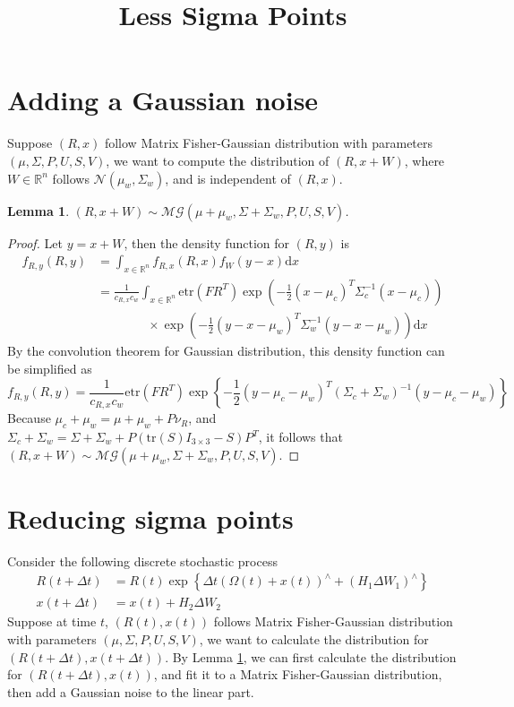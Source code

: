 \documentclass[10pt]{article}
\title{\vspace{-4ex}\textbf{Less Sigma Points\vspace{-4ex}}}
\date{}
\newtheorem{lemma}{Lemma}
\newcommand{\tr}[1]{\ensuremath{\mathrm{tr}\left( #1 \right)}}
\newcommand{\etr}[1]{\ensuremath{\mathrm{etr}\left( #1 \right)}}
\newcommand{\real}[1]{\ensuremath{\mathbb{R}^{ #1 }}}
\newcommand{\diff}[1]{\ensuremath{\mathrm{d} #1}}
\begin{document}
\maketitle

\section{Adding a Gaussian noise}
Suppose $(R,x)$ follow Matrix Fisher-Gaussian distribution with parameters $(\mu,\Sigma,P,U,S,V)$, we want to compute the distribution of $(R,x+W)$, where $W\in\real{n}$ follows $\mathcal{N}(\mu_w,\Sigma_w)$, and is independent of $(R,x)$.
\begin{lemma} \label{lamma:AddGaussianNoise}
	$(R,x+W)\sim\mathcal{MG}(\mu+\mu_w,\Sigma+\Sigma_w,P,U,S,V)$.
\end{lemma}
\begin{proof}
	Let $y=x+W$, then the density function for $(R,y)$ is
	\begin{align} \label{eqn:fRy}
		f_{R,y}(R,y) &= \int_{x\in\real{n}}f_{R,x}(R,x)f_W(y-x)\diff{x} \nonumber \\
		&= \frac{1}{c_{R,x}c_w}\int_{x\in\real{n}} \etr{FR^T} \exp\left(-\frac{1}{2}(x-\mu_c)^T\Sigma_c^{-1}(x-\mu_c)\right) \nonumber \\ 
		&\qquad\qquad\times \exp\left(-\frac{1}{2}(y-x-\mu_w)^T\Sigma_w^{-1}(y-x-\mu_w)\right) \diff{x}
	\end{align}
	By the convolution theorem for Gaussian distribution, this density function can be simplified as
	\begin{equation*}
		f_{R,y}(R,y) = \frac{1}{c_{R,x}c_w}\etr{FR^T} \exp\left\{-\frac{1}{2}(y-\mu_c-\mu_w)^T(\Sigma_c+\Sigma_w)^{-1}(y-\mu_c-\mu_w)\right\}
	\end{equation*}
	Because $\mu_c+\mu_w = \mu+\mu_w+P\nu_R$, and $\Sigma_c+\Sigma_w = \Sigma+\Sigma_w+P(\tr{S}I_{3\times 3}-S)P^T$, it follows that $(R,x+W)\sim\mathcal{MG}(\mu+\mu_w,\Sigma+\Sigma_w,P,U,S,V)$.
\end{proof}

\section{Reducing sigma points}

Consider the following discrete stochastic process
\begin{align}
	R(t+\Delta t) &= R(t)\exp\left\{ \Delta t (\Omega(t)+x(t))^\wedge + (H_1\Delta W_1)^\wedge \right\} \\
	x(t+\Delta t) &= x(t) + H_2\Delta W_2
\end{align}
Suppose at time $t$, $(R(t),x(t))$ follows Matrix Fisher-Gaussian distribution with parameters $(\mu,\Sigma,P,U,S,V)$, we want to calculate the distribution for $(R(t+\Delta t),x(t+\Delta t))$.
By Lemma \ref{lamma:AddGaussianNoise}, we can first calculate the distribution for $(R(t+\Delta t),x(t))$, and fit it to a Matrix Fisher-Gaussian distribution, then add a Gaussian noise to the linear part.
\end{document}
